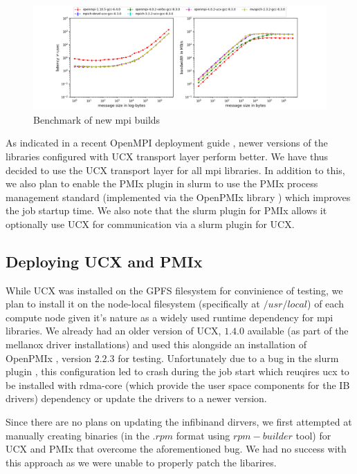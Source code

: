 \documentclass[sigconf,authordraft]{acmart}
\begin{document}
\begin{figure}[h]
	\centering
	\includegraphics[width=\linewidth]{new_mpi}
	\caption{Benchmark of new mpi builds}
	\label{fig:newmpi}
\end{figure}

As indicated in a recent OpenMPI deployment guide \cite{openmpi_deployment_tuning}, newer versions of the libraries configured with UCX transport layer perform better. We have thus  decided to use the UCX transport layer for all mpi libraries. In addition to this, we also plan to enable the PMIx plugin \cite{slurm_pmix_sc17,slurm_pmix_2019} in slurm to use the PMIx process management standard \cite{pmix,pmix_website} (implemented via the OpenPMIx library \cite{openpmix_website}) which improves the job startup time. We also note that the slurm plugin for PMIx allows it optionally use UCX for communication via a slurm plugin for UCX.

\subsection{Deploying UCX and PMIx}
While UCX was installed on the GPFS filesystem for convinience of testing, we plan to install it on the node-local filesystem (specifically at $/usr/local$) of each compute node given it's nature as a widely used runtime dependency for mpi libraries. We already had an older version of UCX, $1.4.0$ available (as part of the mellanox driver installations) and used this alongside an installation of OpenPMIx \cite{openpmix_website}, version $2.2.3$ for testing. Unfortunately due to a bug in the slurm plugin \cite{slurm_ucx_bug}, this configuration led to crash during the job start which reuqires ucx to be installed with rdma-core \cite{rdmacore_repository}(which provide the user space components for the IB drivers) dependency or update the drivers to a newer version.

Since there are no plans on updating the infibinand dirvers, we first attempted at manually creating binaries (in the $.rpm$ format using $rpm-builder$ tool) for UCX and PMIx that overcome the aforementioned bug. We had no success with this approach as we were unable to properly patch the libarires.
\end{document}
